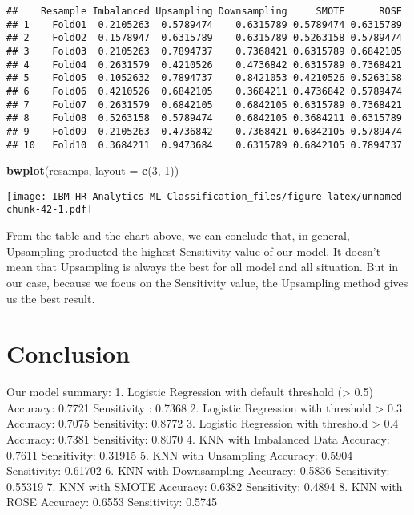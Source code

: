 \documentclass[
]{article}
\newenvironment{Shaded}{\begin{snugshade}}{\end{snugshade}}
\newcommand{\DataTypeTok}[1]{\textcolor[rgb]{0.13,0.29,0.53}{#1}}
\newcommand{\DecValTok}[1]{\textcolor[rgb]{0.00,0.00,0.81}{#1}}
\newcommand{\KeywordTok}[1]{\textcolor[rgb]{0.13,0.29,0.53}{\textbf{#1}}}
\newcommand{\NormalTok}[1]{#1}
\begin{document}
\begin{verbatim}
##    Resample Imbalanced Upsampling Downsampling     SMOTE      ROSE
## 1    Fold01  0.2105263  0.5789474    0.6315789 0.5789474 0.6315789
## 2    Fold02  0.1578947  0.6315789    0.6315789 0.5263158 0.5789474
## 3    Fold03  0.2105263  0.7894737    0.7368421 0.6315789 0.6842105
## 4    Fold04  0.2631579  0.4210526    0.4736842 0.6315789 0.7368421
## 5    Fold05  0.1052632  0.7894737    0.8421053 0.4210526 0.5263158
## 6    Fold06  0.4210526  0.6842105    0.3684211 0.4736842 0.5789474
## 7    Fold07  0.2631579  0.6842105    0.6842105 0.6315789 0.7368421
## 8    Fold08  0.5263158  0.5789474    0.6842105 0.3684211 0.6315789
## 9    Fold09  0.2105263  0.4736842    0.7368421 0.6842105 0.5789474
## 10   Fold10  0.3684211  0.9473684    0.6315789 0.6842105 0.7894737
\end{verbatim}

\begin{Shaded}
\begin{Highlighting}[]
\KeywordTok{bwplot}\NormalTok{(resamps, }\DataTypeTok{layout =} \KeywordTok{c}\NormalTok{(}\DecValTok{3}\NormalTok{, }\DecValTok{1}\NormalTok{))}
\end{Highlighting}
\end{Shaded}

\texttt{[image: IBM-HR-Analytics-ML-Classification\_files/figure-latex/unnamed-chunk-42-1.pdf]}

From the table and the chart above, we can conclude that, in general,
Upsampling producted the highest Sensitivity value of our model. It
doesn't mean that Upsampling is always the best for all model and all
situation. But in our case, because we focus on the Sensitivity value,
the Upsampling method gives us the best result.

\hypertarget{conclusion}{%
\section{Conclusion}\label{conclusion}}

Our model summary: 1. Logistic Regression with default threshold
(\textgreater{} 0.5) Accuracy: 0.7721 Sensitivity : 0.7368 2. Logistic
Regression with threshold \textgreater{} 0.3 Accuracy: 0.7075
Sensitivity: 0.8772 3. Logistic Regression with threshold \textgreater{}
0.4 Accuracy: 0.7381 Sensitivity: 0.8070 4. KNN with Imbalanced Data
Accuracy: 0.7611 Sensitivity: 0.31915 5. KNN with Unsampling Accuracy:
0.5904 Sensitivity: 0.61702 6. KNN with Downsampling Accuracy: 0.5836
Sensitivity: 0.55319 7. KNN with SMOTE Accuracy: 0.6382 Sensitivity:
0.4894 8. KNN with ROSE Accuracy: 0.6553 Sensitivity: 0.5745
\end{document}
